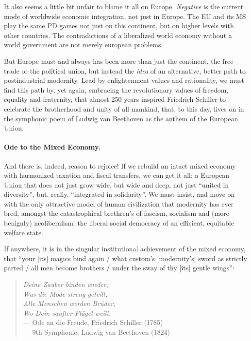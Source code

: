 It also seems a little bit unfair to blame it all on Europe.
\emph{Negative} is the current mode of worldwide economic integration, not just in Europe.
The \gls{EU} and its \gls{MS} play the same \gls{PD} games not just on this continent, but on higher levels with other countries.
The contradictions of a liberalized world economy without a world government are not merely european problems.

But Europe must and always has been more than just the continent, the free trade or the political union, but instead the \emph{idea} of an alternative, better path to postindustrial modernity.
Lead by enlightenment values and rationality, we must find this path by, yet again, embracing the revolutionary values of freedom, equality and fraternity, that almost 250 years inspired Friedrich Schiller to celebrate the brotherhood and unity of all mankind, that, to this day, lives on in the symphonic poem of Ludwig van Beethoven as the anthem of the European Union.

\paragraph{Ode to the Mixed Economy.}
And there is, indeed, reason to rejoice! If we rebuild an intact mixed economy with harmonized taxation and fiscal transfers, we can get it all:
a European Union that does not just grow wide, but wide and deep, not just ``united in diversity'', but, really, ``integrated in solidarity''.
We must insist, and move on with the only attractive model of human civilization that modernity has ever bred, amongst the catastrophical brethren's of fascism, socialism and (more benignly) neoliberalism:
the liberal social democracy of an efficient, equitable welfare state.

If anywhere, it is in the singular institutional achievement of the mixed economy, that ``your [its] magics bind again / what custom's [modernity's] sword as strictly parted / all men become brothers / under the sway of thy [its] gentle wings'':
\begin{verse}
	\emph{Deine Zauber binden wieder,}\\
	\emph{Was die Mode streng geteilt,}\\
	\emph{Alle Menschen werden Br\"{u}der,}\\
	\emph{Wo Dein sanfter Fl\"{u}gel weilt.}\\
	--- Ode an die Freude, Friedrich Schiller (1785)\\
	--- 9th Symphonie, Ludwig van Beethoven (1824)
\end{verse}

